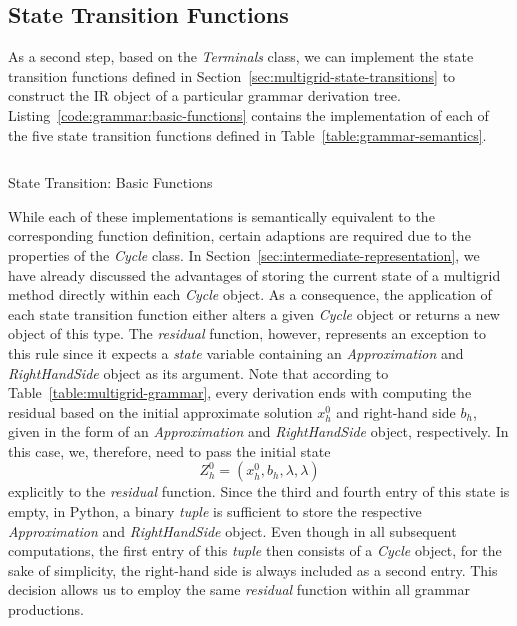 \subsection{State Transition Functions}
\label{sec:evostencils:state-transition-functions}
As a second step, based on the \emph{Terminals} class, we can implement the state transition functions defined in Section~\ref{sec:multigrid-state-transitions} to construct the IR object of a particular grammar derivation tree.
Listing~\ref{code:grammar:basic-functions} contains the implementation of each of the five state transition functions defined in Table~\ref{table:grammar-semantics}.
\begin{listing}
	\inputminted{python}{evostencils/grammar/base.py}
	\caption{State Transition: Basic Functions}
	\label{code:grammar:basic-functions}
\end{listing}
While each of these implementations is semantically equivalent to the corresponding function definition, certain adaptions are required due to the properties of the \emph{Cycle} class.
In Section~\ref{sec:intermediate-representation}, we have already discussed the advantages of storing the current state of a multigrid method directly within each \emph{Cycle} object.
As a consequence, the application of each state transition function either alters a given \emph{Cycle} object or returns a new object of this type.
The \emph{residual} function, however, represents an exception to this rule since it expects a \emph{state} variable containing an \emph{Approximation} and \emph{RightHandSide} object as its argument.
Note that according to Table~\ref{table:multigrid-grammar}, every derivation ends with computing the residual based on the initial approximate solution $x_h^0$ and right-hand side $b_h$, given in the form of an \emph{Approximation} and \emph{RightHandSide} object, respectively.
In this case, we, therefore, need to pass the initial state 
\begin{equation*}
	Z_h^0 = (x_h^0, b_h, \lambda, \lambda)
\end{equation*} explicitly to the \emph{residual} function.
Since the third and fourth entry of this state is empty, in Python, a binary \emph{tuple} is sufficient to store the respective \emph{Approximation} and \emph{RightHandSide} object.
Even though in all subsequent computations, the first entry of this \emph{tuple} then consists of a \emph{Cycle} object, for the sake of simplicity, the right-hand side is always included as a second entry.
This decision allows us to employ the same \emph{residual} function within all grammar productions.
